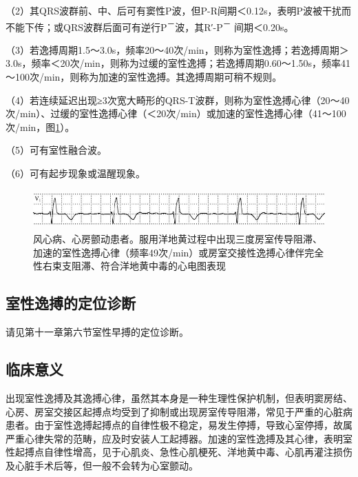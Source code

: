 （2）其QRS波群前、中、后可有窦性P波，但P-R间期＜0.12s，表明P波被干扰而不能下传；或QRS波群后面可有逆行P\textsuperscript{－}波，其R′-P\textsuperscript{－} 间期＜0.20s。

（3）若逸搏周期1.5～3.0s，频率20～40次/min，则称为室性逸搏；若逸搏周期＞3.0s，频率＜20次/min，则称为过缓的室性逸搏；若逸搏周期0.60～1.50s，频率41～100次/min，则称为加速的室性逸搏。其逸搏周期可稍不规则。

（4）若连续延迟出现≥3次宽大畸形的QRS-T波群，则称为室性逸搏心律（20～40次/min）、过缓的室性逸搏心律（＜20次/min）或加速的室性逸搏心律（41～100次/min，图\ref{fig12-14}）。

（5）可有室性融合波。

（6）可有起步现象或温醒现象。

\begin{figure}[!htbp]
 \centering
 \includegraphics[width=5.5625in,height=0.59375in]{./images/Image00208.jpg}
 \captionsetup{justification=centering}
 \caption{风心病、心房颤动患者。服用洋地黄过程中出现三度房室传导阻滞、加速的室性逸搏心律（频率49次/min）或房室交接性逸搏心律伴完全性右束支阻滞、符合洋地黄中毒的心电图表现}
 \label{fig12-14}
  \end{figure} 

\protect\hypertarget{text00019.htmlux5cux23subid188}{}{}

\subsection{室性逸搏的定位诊断}

请见第十一章第六节室性早搏的定位诊断。

\protect\hypertarget{text00019.htmlux5cux23subid189}{}{}

\subsection{临床意义}

出现室性逸搏及其逸搏心律，虽然其本身是一种生理性保护机制，但表明窦房结、心房、房室交接区起搏点均受到了抑制或出现房室传导阻滞，常见于严重的心脏病患者。由于室性逸搏起搏点的自律性极不稳定，易发生停搏，导致心室停搏，故属严重心律失常的范畴，应及时安装人工起搏器。加速的室性逸搏及其心律，表明室性起搏点自律性增高，见于心肌炎、急性心肌梗死、洋地黄中毒、心肌再灌注损伤及心脏手术后等，但一般不会转为心室颤动。

